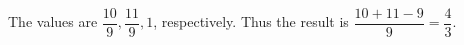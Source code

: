 The values are $\dfrac{10}{9},\dfrac{11}{9},1$, respectively. Thus the result is $\dfrac{10+11-9}{9}=\boxed{\dfrac{4}{3}}$.
